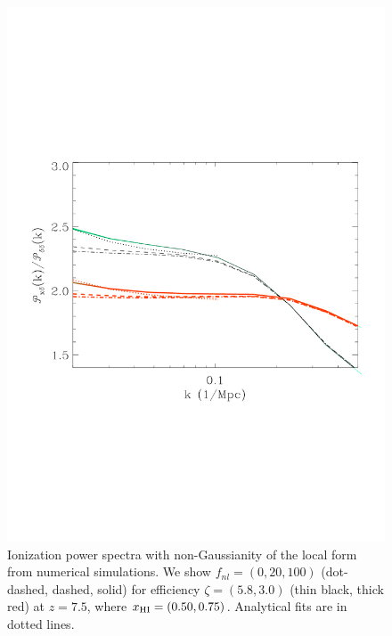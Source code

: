 \documentclass{PoS}
\newcommand{\fnl}{f_{nl}}
\begin{document}
\begin{figure}[!t]
\includegraphics[scale=0.39]{figures/figure2_trim.pdf}
\caption{Ionization power spectra with non-Gaussianity of the local form from numerical simulations. 
We show $\fnl = (0,20,100)$ (dot-dashed, dashed, solid) for efficiency $\zeta = (5.8, 3.0)$ (thin black, thick red) at $z = 7.5$, where $x_{\rm HI} = (0.50, 0.75)$. 
Analytical fits are in dotted lines.}
\label{figurett}
\end{figure}
\end{document}
